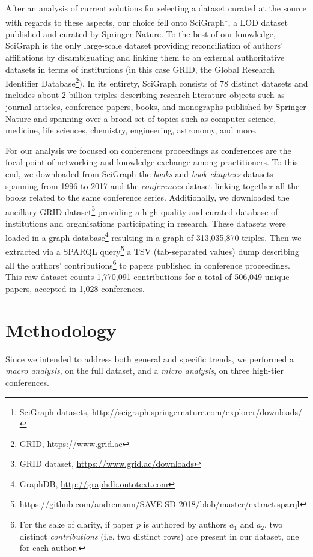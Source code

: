 \documentclass{llncs}
\begin{document}
After an analysis of current solutions for selecting a dataset curated at the source with regards to these aspects, our choice fell onto SciGraph\footnote{SciGraph datasets, \url{http://scigraph.springernature.com/explorer/downloads/}}, a LOD dataset published and curated by Springer Nature.
To the best of our knowledge, SciGraph is the only large-scale dataset providing reconciliation of authors' affiliations by disambiguating and linking them to an external authoritative datasets in terms of institutions (in this case GRID, the Global Research Identifier Database\footnote{GRID, \url{https://www.grid.ac}}).
In its entirety, SciGraph consists of 78 distinct datasets and includes about 2 billion triples describing research literature objects such as journal articles, conference papers, books, and monographs published by Springer Nature and spanning over a broad set of topics such as computer science, medicine, life sciences, chemistry, engineering, astronomy, and more.

For our analysis we focused on conferences proceedings as conferences are the focal point of networking and knowledge exchange among practitioners.
To this end, we downloaded from SciGraph the \textit{books} and \textit{book chapters} datasets spanning from 1996 to 2017 and the \textit{conferences} dataset linking together all the books related to the same conference series.
Additionally, we downloaded the ancillary GRID dataset\footnote{GRID dataset, \url{https://www.grid.ac/downloads}} providing a high-quality and curated database of institutions and organisations participating in research.
These datasets were loaded in a graph database\footnote{GraphDB, \url{http://graphdb.ontotext.com}} resulting in a graph of 313,035,870 triples. 
Then we extracted via a SPARQL query\footnote{\url{https://github.com/andremann/SAVE-SD-2018/blob/master/extract.sparql}} a TSV (tab-separated values) dump describing all the authors' contributions\footnote{For the sake of clarity, if paper $p$ is authored by authors $a_1$ and $a_2$, two distinct \textit{contributions} (i.e. two distinct rows) are present in our dataset, one for each author.} to papers published in conference proceedings.
This raw dataset counts 1,770,091 contributions for a total of 506,049 unique papers, accepted in 1,028 conferences.


\section{Methodology}
\label{sec:method}
Since we intended to address both general and specific trends, we performed a \textit{macro analysis}, on the full dataset, and a \textit{micro analysis}, on three high-tier conferences.
\end{document}
